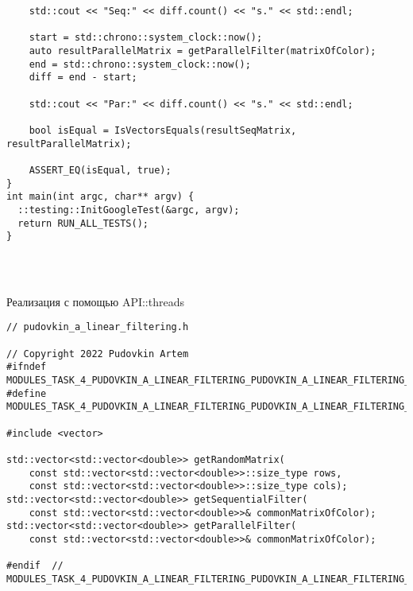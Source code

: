 \documentclass{report}
\begin{document}
\begin{lstlisting}
    std::cout << "Seq:" << diff.count() << "s." << std::endl;

    start = std::chrono::system_clock::now();
    auto resultParallelMatrix = getParallelFilter(matrixOfColor);
    end = std::chrono::system_clock::now();
    diff = end - start;

    std::cout << "Par:" << diff.count() << "s." << std::endl;

    bool isEqual = IsVectorsEquals(resultSeqMatrix, resultParallelMatrix);

    ASSERT_EQ(isEqual, true);
}
int main(int argc, char** argv) {
  ::testing::InitGoogleTest(&argc, argv);
  return RUN_ALL_TESTS();
}


	
\end{lstlisting}
Реализация с помощью API::threads
\begin{lstlisting}
// pudovkin_a_linear_filtering.h

// Copyright 2022 Pudovkin Artem
#ifndef MODULES_TASK_4_PUDOVKIN_A_LINEAR_FILTERING_PUDOVKIN_A_LINEAR_FILTERING_H_
#define MODULES_TASK_4_PUDOVKIN_A_LINEAR_FILTERING_PUDOVKIN_A_LINEAR_FILTERING_H_

#include <vector>

std::vector<std::vector<double>> getRandomMatrix(
    const std::vector<std::vector<double>>::size_type rows,
    const std::vector<std::vector<double>>::size_type cols);
std::vector<std::vector<double>> getSequentialFilter(
    const std::vector<std::vector<double>>& commonMatrixOfColor);
std::vector<std::vector<double>> getParallelFilter(
    const std::vector<std::vector<double>>& commonMatrixOfColor);

#endif  // MODULES_TASK_4_PUDOVKIN_A_LINEAR_FILTERING_PUDOVKIN_A_LINEAR_FILTERING_H_

\end{lstlisting}
\end{document}
